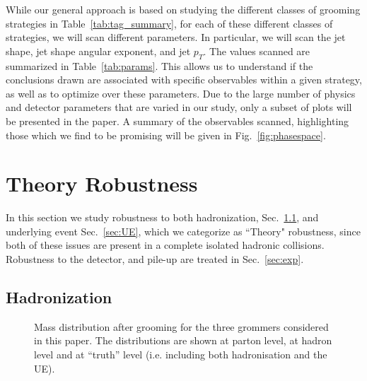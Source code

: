\documentclass[11pt,letterpaper]{article}
\DeclareRobustCommand{\Sec}[1]{Sec.~\ref{#1}}
\DeclareRobustCommand{\Tab}[1]{Table~\ref{#1}}
\DeclareRobustCommand{\Fig}[1]{Fig.~\ref{#1}}
\begin{document}
While our general approach is based on studying the different classes of grooming strategies in \Tab{tab:tag_summary}, for each of these different classes of strategies, we will scan different parameters.
%
In particular, we will scan the jet shape, jet shape angular exponent, and jet $p_T$.
%
The values scanned are summarized in \Tab{tab:params}.
%
This allows us to understand if the conclusions drawn are associated with specific observables within a given strategy, as well as to optimize over these parameters.
%
Due to the large number of physics and detector parameters that are varied in our study, only a subset of plots will be presented in the paper. A summary of the observables scanned, highlighting those which we find to be promising will be given in \Fig{fig:phasespace}.
%






\section{Theory Robustness}\label{sec:np}


In this section we study robustness to both hadronization, \Sec{sec:hadr}, and underlying event \Sec{sec:UE}, which we categorize as ``Theory" robustness, since both of these issues are present in a complete isolated hadronic collisions. Robustness to the detector, and pile-up are treated in \Sec{sec:exp}. 




\subsection{Hadronization}\label{sec:hadr}




\begin{figure}
  \caption{Mass distribution after grooming for the three grommers
    considered in this paper. The distributions are shown at parton
    level, at hadron level and at ``truth'' level (i.e. including both
    hadronisation and the UE).}\label{fig:mass-distribution}
\end{figure}
\end{document}
